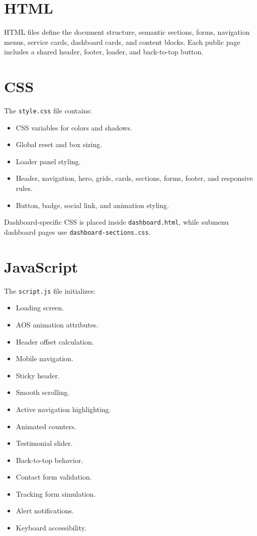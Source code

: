 \documentclass[12pt,a4paper]{report}
\begin{document}
\section{HTML}
HTML files define the document structure, semantic sections, forms, navigation menus, service cards, dashboard cards, and content blocks. Each public page includes a shared header, footer, loader, and back-to-top button.

\section{CSS}
The \texttt{style.css} file contains:
\begin{itemize}[leftmargin=0.4in]
    \item CSS variables for colors and shadows.
    \item Global reset and box sizing.
    \item Loader panel styling.
    \item Header, navigation, hero, grids, cards, sections, forms, footer, and responsive rules.
    \item Button, badge, social link, and animation styling.
\end{itemize}

Dashboard-specific CSS is placed inside \texttt{dashboard.html}, while submenu dashboard pages use \texttt{dashboard-sections.css}.

\section{JavaScript}
The \texttt{script.js} file initializes:
\begin{itemize}[leftmargin=0.4in]
    \item Loading screen.
    \item AOS animation attributes.
    \item Header offset calculation.
    \item Mobile navigation.
    \item Sticky header.
    \item Smooth scrolling.
    \item Active navigation highlighting.
    \item Animated counters.
    \item Testimonial slider.
    \item Back-to-top behavior.
    \item Contact form validation.
    \item Tracking form simulation.
    \item Alert notifications.
    \item Keyboard accessibility.
\end{itemize}
\end{document}
